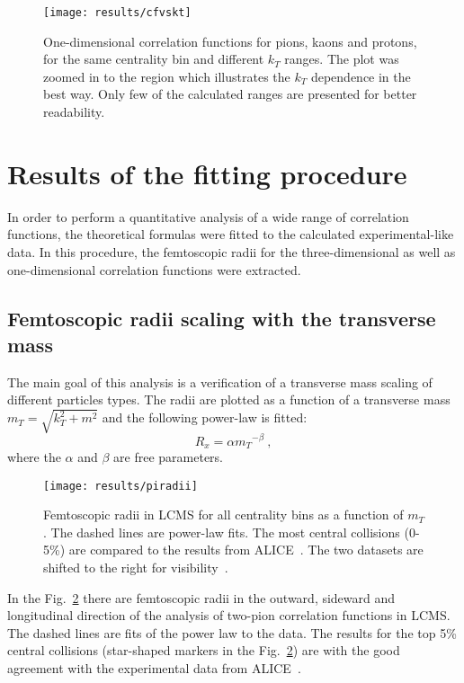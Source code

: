       \begin{figure}[h]
        \centering
        \centerline{\texttt{[image: results/cfvskt]}}
        \caption{One-dimensional correlation functions for pions, kaons and protons, for the same centrality bin and different $k_T$ ranges. The plot was zoomed in to the region which illustrates the $k_T$ dependence in the best way. Only few of the calculated ranges are presented for better readability.}
      \label{fig:kt_dep}
      \end{figure}
    \FloatBarrier
    \clearpage
  \section{Results of the fitting procedure}
  In order to perform a quantitative analysis of a wide range of correlation functions, the theoretical formulas were fitted to the calculated experimental-like data.
  In this procedure, the femtoscopic radii for the three-dimensional as well as one-dimensional correlation functions were extracted.
    \subsection{Femtoscopic radii scaling with the transverse mass}
      The main goal of this analysis is a verification of a transverse mass scaling of different particles types.
      The radii are plotted as a function of a transverse mass $m_T = \sqrt{k_T^2 +m^2}$ and the following power-law is fitted:
      \begin{equation}
        R_x = \alpha {m_T}^{-\beta}~,
      \end{equation}
      where the $\alpha$ and $\beta$ are free parameters.
      \begin{figure}[b]
        \centering
        \centerline{\texttt{[image: results/piradii]}}
        \caption{Femtoscopic radii in LCMS for all centrality bins as a function of $m_T$. The dashed lines are power-law fits. The most central collisions (0-5\%) are compared to the results from ALICE~\cite{alice_pion}. The two datasets are shifted to the right for visibility~\cite{galazyn}.}
      \label{fig:piradii}
      \end{figure}

      In the Fig.~\ref{fig:piradii} there are femtoscopic radii in the outward, sideward and longitudinal direction of the analysis of two-pion correlation functions in LCMS.
      The dashed lines are fits of the power law to the data.
      The results for the top 5\% central collisions (star-shaped markers in the Fig.~\ref{fig:piradii}) are with the good agreement with the experimental data from ALICE~\cite{alice_pion}.

